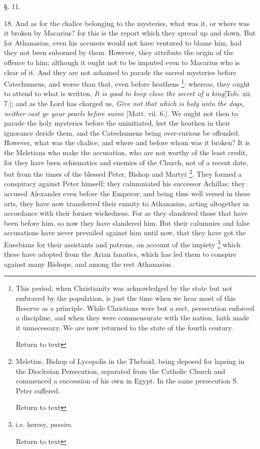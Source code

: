 §. 11.

18. And as for the chalice belonging to the
mysteries, what was it, or where was it broken by Macarius? for this
is the report which they spread up and down. But for Athanasius, even
his accusers would not have ventured to blame him, had they not been
suborned by them. However, they attribute the origin of the offence to
him; although it ought not to be imputed even to Macarius who is clear
of it. And they are not ashamed to parade the sacred mysteries before
Catechumens, and worse than that, even before heathens \footnote{This period, when Christianity was acknowledged by the state but not
embraced by the population, is just the time when we hear most of this
Reserve as a principle. While Christians were but a sect, persecution
enforced a discipline, and when they were commensurate with the
nation, faith made it unnecessary. We are now returned to the state of
the fourth century.

Return to text}: whereas, they ought to attend to what is written, \emph{It is
good to keep close the secret of a king}[Tob. xii. 7.]; and as the
Lord has charged us, \emph{Give not that which is holy unto the dogs,
neither cast ye your pearls before swine} [Matt. vii. 6.]. We ought
not then to parade the holy mysteries before the uninitiated, lest the
heathen in their ignorance deride them, and the Catechumens being
over-curious be offended. However, what was the chalice, and where and
before whom was it broken? It is the Meletians who make the
accusation, who are not worthy of the least credit, for they have been
schismatics and enemies of the Church, not of a recent date, but from
the times of the blessed Peter, Bishop and Martyr \footnote{Meletius, Bishop of Lycopolis in the Thebaid, being deposed for
lapsing in the Dioclesian Persecution, separated from the Catholic
Church and commenced a succession of his own in Egypt. In the same
persecution S. Peter suffered.

Return to text}. They formed a conspiracy against Peter himself; they
calumniated his successor Achillas; they accused Alexander even before
the Emperor; and being thus well versed in these arts, they have now
transferred their enmity to Athanasius, acting altogether in
accordance with their former wickedness. For as they slandered those
that have been before him, so now they have slandered him. But their
calumnies and false accusations have never prevailed against him until
now, that they have got the Eusebians for their assistants and
patrons, on account of the impiety \footnote{i.e. heresy, \emph{passim}.

Return to text} which these have adopted from the Arian fanatics, which has
led them to conspire against many Bishops, and among the rest
Athanasius.

